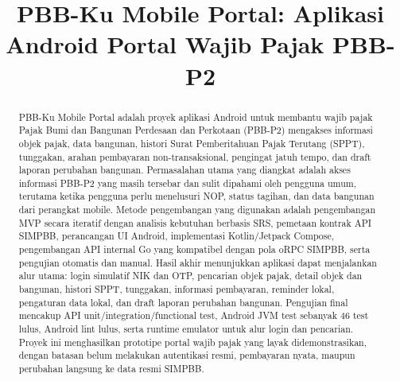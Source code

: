 \documentclass[conference]{report-assets/ref/IEEE-conference-template-062824/IEEEtran}
\begin{document}
\raggedbottom

\title{PBB-Ku Mobile Portal: Aplikasi Android Portal Wajib Pajak PBB-P2}

\author{
\and
{}
\and
{}
}

\maketitle

\begin{abstract}
PBB-Ku Mobile Portal adalah proyek aplikasi Android untuk membantu wajib pajak Pajak Bumi dan Bangunan Perdesaan dan Perkotaan (PBB-P2) mengakses informasi objek pajak, data bangunan, histori Surat Pemberitahuan Pajak Terutang (SPPT), tunggakan, arahan pembayaran non-transaksional, pengingat jatuh tempo, dan draft laporan perubahan bangunan. Permasalahan utama yang diangkat adalah akses informasi PBB-P2 yang masih tersebar dan sulit dipahami oleh pengguna umum, terutama ketika pengguna perlu menelusuri NOP, status tagihan, dan data bangunan dari perangkat mobile. Metode pengembangan yang digunakan adalah pengembangan MVP secara iteratif dengan analisis kebutuhan berbasis SRS, pemetaan kontrak API SIMPBB, perancangan UI Android, implementasi Kotlin/Jetpack Compose, pengembangan API internal Go yang kompatibel dengan pola oRPC SIMPBB, serta pengujian otomatis dan manual. Hasil akhir menunjukkan aplikasi dapat menjalankan alur utama: login simulatif NIK dan OTP, pencarian objek pajak, detail objek dan bangunan, histori SPPT, tunggakan, informasi pembayaran, reminder lokal, pengaturan data lokal, dan draft laporan perubahan bangunan. Pengujian final mencakup API unit/integration/functional test, Android JVM test sebanyak 46 test lulus, Android lint lulus, serta runtime emulator untuk alur login dan pencarian. Proyek ini menghasilkan prototipe portal wajib pajak yang layak didemonstrasikan, dengan batasan belum melakukan autentikasi resmi, pembayaran nyata, maupun perubahan langsung ke data resmi SIMPBB.
\end{abstract}
\end{document}
